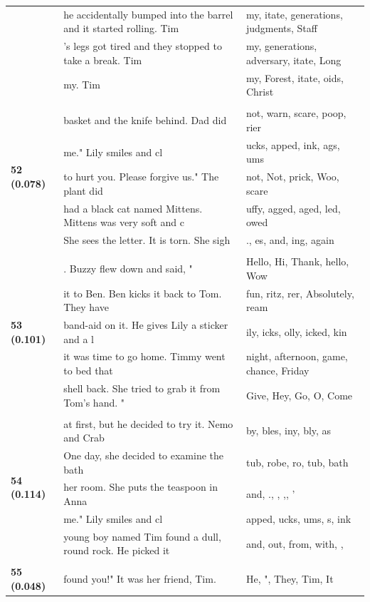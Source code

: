 \documentclass{article}
\theoremstyle{plain}
\theoremstyle{definition}
\theoremstyle{remark}
\begin{document}
\begin{longtable}{|p{}|p{}|p{}|}
& he accidentally bumped into the barrel and it started rolling. Tim & my, itate,  generations,  judgments, Staff \\
& 's legs got tired and they stopped to take a break. Tim & my,  generations,  adversary, itate, Long \\
& my. Tim & my, Forest, itate, oids,  Christ \\
& & \\
\multirow{5}{*}{\textbf{52 (0.078)}} & basket and the knife behind.  Dad did & not,  warn,  scare,  poop, rier \\
& me."  Lily smiles and cl & ucks, apped, ink, ags, ums \\
& to hurt you. Please forgive us."  The plant did & not,  Not,  prick,  Woo,  scare \\
& had a black cat named Mittens. Mittens was very soft and c & uffy, agged, aged, led, owed \\
& She sees the letter. It is torn. She sigh & ., es,  and, ing,  again \\
& & \\
\multirow{5}{*}{\textbf{53 (0.101)}} & .  Buzzy flew down and said, " & Hello, Hi, Thank, hello, Wow \\
& it to Ben. Ben kicks it back to Tom. They have & fun, ritz, rer,  Absolutely, ream \\
& band-aid on it. He gives Lily a sticker and a l & ily, icks, olly, icked, kin \\
& it was time to go home. Timmy went to bed that & night,  afternoon,  game,  chance,  Friday \\
& shell back. She tried to grab it from Tom's hand.  " & Give, Hey, Go, O, Come \\
& & \\
\multirow{5}{*}{\textbf{54 (0.114)}} & at first, but he decided to try it.  Nemo and Crab & by, bles, iny, bly, as \\
& One day, she decided to examine the bath & tub, robe, ro,  tub,  bath \\
& her room. She puts the teaspoon in Anna & and, ., , ,, ' \\
& me."  Lily smiles and cl & apped, ucks, ums, s, ink \\
& young boy named Tim found a dull, round rock. He picked it & and,  out,  from,  with, , \\
& & \\
\multirow{5}{*}{\textbf{55 (0.048)}} & found you!" It was her friend, Tim. & He,  ",  They,  Tim,  It \\

\end{longtable}
\end{document}
